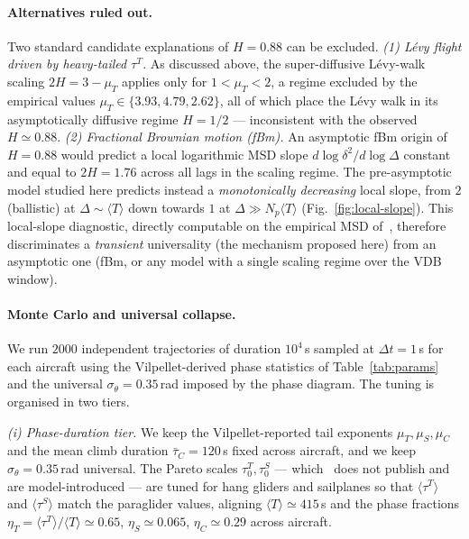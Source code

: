 \documentclass[10pt,twocolumn,a4paper]{article}
\begin{document}
\paragraph*{Alternatives ruled out.}
Two standard candidate explanations of $H=0.88$ can be excluded.
\emph{(1) L\'evy flight driven by heavy-tailed $\tau^T$.} As
discussed above, the super-diffusive L\'evy-walk scaling
$2H=3-\mu_T$ applies only for $1<\mu_T<2$, a regime excluded by
the empirical values $\mu_T\in\{3.93,4.79,2.62\}$, all of which
place the L\'evy walk in its asymptotically diffusive regime
$H=1/2$ --- inconsistent with the observed $H\simeq 0.88$.
\emph{(2) Fractional Brownian motion (fBm).} An asymptotic fBm
origin of $H=0.88$ would predict a local logarithmic MSD slope
$d\log\delta^2/d\log\Delta$ constant and equal to $2H=1.76$
across all lags in the scaling regime. The pre-asymptotic model
studied here predicts instead a \emph{monotonically decreasing}
local slope, from $2$ (ballistic) at
$\Delta\sim\langle T\rangle$ down towards $1$ at
$\Delta\gg N_p\langle T\rangle$ (Fig.~\ref{fig:local-slope}). This
local-slope diagnostic, directly computable on the empirical MSD
of~\cite{vilpellet2026}, therefore discriminates a
\emph{transient} universality (the mechanism proposed here) from
an asymptotic one (fBm, or any model with a single scaling
regime over the VDB window).

\paragraph*{Monte Carlo and universal collapse.}
We run $2000$ independent trajectories of duration $10^4$\,s
sampled at $\Delta t=1$\,s for each aircraft using the
Vilpellet-derived phase statistics of Table~\ref{tab:params} and
the universal $\sigma_\theta=0.35$\,rad imposed by the phase
diagram. The tuning is organised in two tiers.

\emph{(i) Phase-duration tier.} We keep the Vilpellet-reported tail
exponents $\mu_T,\mu_S,\mu_C$ and the mean climb duration
$\bar{\tau}_C=120$\,s fixed across aircraft, and we keep
$\sigma_\theta=0.35$\,rad universal. The Pareto scales
$\tau_0^T,\tau_0^S$ --- which~\cite{vilpellet2026} does not publish
and are model-introduced --- are tuned for hang gliders and
sailplanes so that $\langle\tau^T\rangle$ and $\langle\tau^S\rangle$
match the paraglider values, aligning
$\langle T\rangle\simeq 415$\,s and the phase fractions
$\eta_T=\langle\tau^T\rangle/\langle T\rangle\simeq 0.65$,
$\eta_S\simeq 0.065$, $\eta_C\simeq 0.29$ across aircraft.
\end{document}
